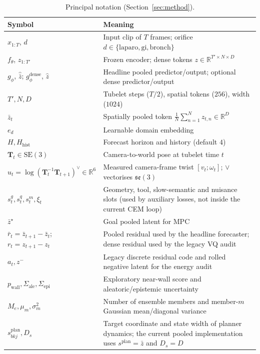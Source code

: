\documentclass[preprint,12pt]{elsarticle}
\begin{document}
\begin{table}[t]
\centering
\caption{Principal notation (Section~\ref{sec:method}).}
\label{tab:notation}
\scriptsize
\begin{tabular}{@{}lp{}@{}}
\toprule
Symbol & Meaning \\
\midrule
$x_{1:T}$, $d$ & Input clip of $T$ frames; orifice $d\in\{\mathrm{laparo},\mathrm{gi},\mathrm{bronch}\}$ \\
$f_\theta$, $z_{1:T'}$ & Frozen encoder; dense tokens $z\in\mathbb{R}^{T'\times N\times D}$ \\
$g_\phi$, $\hat{\bar z}$; $g_\phi^{\mathrm{dense}}$, $\hat z$ & Headline pooled predictor/output; optional dense predictor/output \\
$T',N,D$ & Tubelet steps ($T/2$), spatial tokens ($256$), width ($1024$) \\
$\bar z_t$ & Spatially pooled token $\frac{1}{N}\sum_{n=1}^{N}z_{t,n}\in\mathbb{R}^{D}$ \\
$e_d$ & Learnable domain embedding \\
$H,H_{\mathrm{hist}}$ & Forecast horizon and history (default $4$) \\
$\mathbf{T}_t\in\mathrm{SE}(3)$ & Camera-to-world pose at tubelet time $t$ \\
$u_t=\log(\mathbf{T}_t^{-1}\mathbf{T}_{t+1})^\vee\in\mathbb{R}^6$ & Measured camera-frame twist $[v_t;\omega_t]$; $\vee$ vectorises $\mathfrak{se}(3)$ \\
$s_t^{g},s_t^{q},s_t^{m},\xi_t$ & Geometry, tool, slow-semantic and nuisance slots (used by auxiliary losses, not inside the current CEM loop) \\
$\bar z^\star$ & Goal pooled latent for MPC \\
$\bar r_t=\bar z_{t+1}-\bar z_t$; $r_t=z_{t+1}-z_t$ & Pooled residual used by the headline forecaster; dense residual used by the legacy VQ audit \\
$a_t,z^{-}$ & Legacy discrete residual code and rolled negative latent for the energy audit \\
$p_{\mathrm{wall}},\Sigma_{\mathrm{ale}},\Sigma_{\mathrm{epi}}$ & Exploratory near-wall score and aleatoric/epistemic uncertainty \\
$M_e,\mu_m,\sigma_m^2$ & Number of ensemble members and member-$m$ Gaussian mean/diagonal variance \\
$s^{\mathrm{plan}}_{bkj},D_s$ & Target coordinate and state width of planner dynamics; the current pooled implementation uses $s^{\mathrm{plan}}=\bar z$ and $D_s=D$ \\

\end{tabular}
\end{table}
\end{document}
